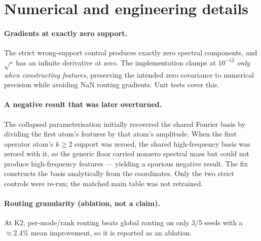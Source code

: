 \section{Numerical and engineering details}
\label{app:numerical}

\paragraph{Gradients at exactly zero support.} The strict wrong-support control produces
exactly zero spectral components, and $\sqrt{\cdot}$ has an infinite derivative at zero.  The
implementation clamps at $10^{-12}$ \emph{only when constructing features}, preserving the
intended zero covariance to numerical precision while avoiding NaN routing gradients.  Unit
tests cover this.

\paragraph{A negative result that was later overturned.} The collapsed parameterisation
initially recovered the shared Fourier basis by dividing the first atom's features by that
atom's amplitude.  When the first operator atom's $k \ge 2$ support was zeroed, the shared
high-frequency basis was zeroed with it, so the generic floor carried nonzero spectral mass
but could not produce high-frequency features --- yielding a spurious negative result.  The
fix constructs the basis analytically from the coordinates.  Only the two strict controls
were re-run; the matched main table was not retrained.

\paragraph{Routing granularity (ablation, not a claim).} At K2, per-mode/rank routing beats
global routing on only 3/5 seeds with a $\approx 2.4\%$ mean improvement, so it is reported
as an ablation.
